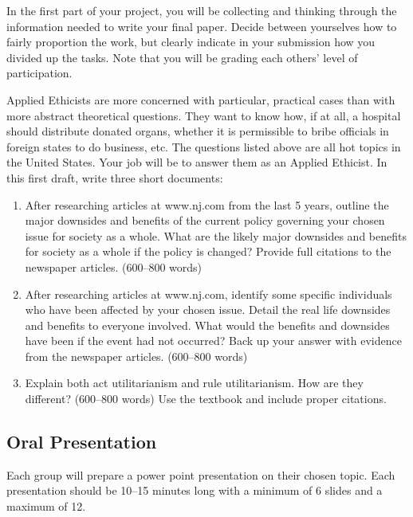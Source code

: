 \documentclass[10pt]{article}
\providecommand{\tightlist}{%
  \setlength{\itemsep}{0pt}\setlength{\parskip}{0pt}}
\begin{document}
In the first part of your project, you will be collecting and thinking
through the information needed to write your final paper. Decide between
yourselves how to fairly proportion the work, but clearly indicate in
your submission how you divided up the tasks. Note that you will be
grading each others' level of participation.

Applied Ethicists are more concerned with particular, practical cases
than with more abstract theoretical questions. They want to know how, if
at all, a hospital should distribute donated organs, whether it is
permissible to bribe officials in foreign states to do business, etc.
The questions listed above are all hot topics in the United States. Your
job will be to answer them as an Applied Ethicist. In this first draft,
write three short documents:

\begin{enumerate}
\def\labelenumi{\arabic{enumi}.}
\tightlist
\item
  After researching articles at www.nj.com from the last 5 years,
  outline the major downsides and benefits of the current policy governing your chosen issue for society as a whole. What are the likely major downsides and benefits for society as a whole if the policy is changed? Provide full citations to the newspaper articles. 
  (600--800 words)
\item
 After researching articles at www.nj.com, identify some specific individuals who have been affected by your chosen issue.  Detail the real life downsides and benefits to everyone involved. What would the benefits and downsides have been if the event had not occurred? Back up your answer with evidence from the newspaper articles.    (600--800 words)

\item
  Explain both act utilitarianism and rule utilitarianism. How are they
  different? (600--800 words) Use the textbook and include proper citations.

\end{enumerate}

\subsection{Oral Presentation}\label{oral-presentation}

Each group will prepare a power point presentation on their chosen
topic. Each presentation should be 10--15 minutes long with a minimum of
6 slides and a maximum of 12.
\end{document}
